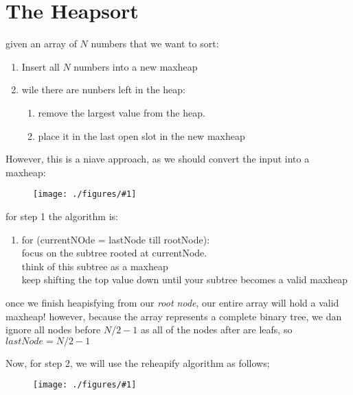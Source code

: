 \documentclass[12pt]{book}
\title{\coursetitle\linebreak\lecturename}
\author{\\Cain Susko\\ 
           \\ \\ \\
      Queen's University 
    \\School of Computing\\}
\newcommand{\incimg}[2]{%
       \begin{figure}[h]
               \centering
               \texttt{[image: ./figures/\#1]}
       \end{figure}
}
\begin{document}
\begin{titlepage}
        \maketitle
\end{titlepage}


\section*{The Heapsort}
given an array of $N$ numbers that we want to sort:
\begin{enumerate}
        \item Insert all $N$ numbers into a new maxheap
        \item wile there are nunbers left in the heap:
                \begin{enumerate}
                        \item remove the largest value from the heap.
                        \item place it in the last open slot in the new maxheap
                \end{enumerate}
\end{enumerate}
However, this is a niave approach, as we should convert the input into a maxheap:
\incimg{maxheapSort}{0.5}

for step 1 the algorithm is:
\begin{enumerate}
        \item for (currentNOde = lastNode till rootNode):\\
                focus on the subtree rooted at currentNode.\\
                think of this subtree as a maxheap\\
                keep shifting the top value down until your subtree becomes a valid maxheap
\end{enumerate}
once we finish heapisfying from our \textit{root node}, our entire array will hold a valid maxheap!
however, because the array represents a complete binary tree, we dan ignore all nodes before $N/2 -1$ as all of the nodes after are leafs, so
$lastNode = N/2 - 1$
\pagebreak

Now, for step 2, we will use the reheapify algorithm as follows;
\incimg{reheap}{0.5}
\end{document}
